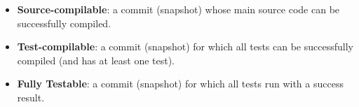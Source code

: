 \begin{itemize}
\item \textbf{Source-compilable}: a commit (snapshot) whose main source code can be successfully compiled. 
\item \textbf{Test-compilable}: a commit (snapshot) for which all tests can be successfully compiled (and has at least one test).
\item \textbf{Fully Testable}: a commit (snapshot) for which all tests run with a success result.

\end{itemize}

